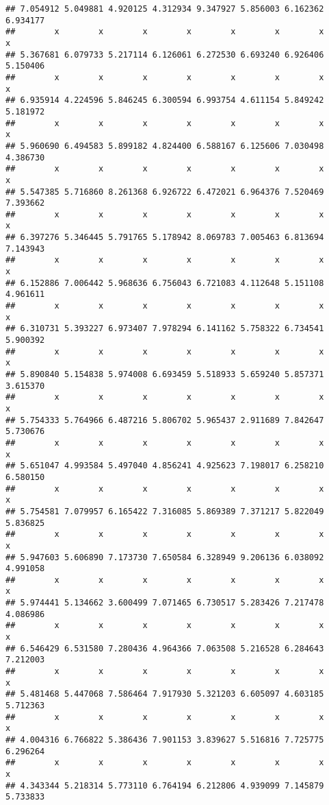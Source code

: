 \documentclass[a4paper,10pt]{book}\usepackage[]{graphicx}\usepackage[]{color}
\makeatletter
\newenvironment{kframe}{%
 \def\at@end@of@kframe{}%
 \ifinner\ifhmode%
  \def\at@end@of@kframe{\end{minipage}}%
  \begin{minipage}{\columnwidth}%
 \fi\fi%
 \def\FrameCommand##1{\hskip\@totalleftmargin \hskip-\fboxsep
 \colorbox{shadecolor}{##1}\hskip-\fboxsep
     \hskip-\linewidth \hskip-\@totalleftmargin \hskip\columnwidth}%
 \MakeFramed {\advance\hsize-\width
   \@totalleftmargin\z@ \linewidth\hsize
   \@setminipage}}%
 {\par\unskip\endMakeFramed%
 \at@end@of@kframe}
\newenvironment{knitrout}{}{} %
\makeatother
\begin{document}
\begin{knitrout}
\begin{kframe}
\begin{verbatim}
## 7.054912 5.049881 4.920125 4.312934 9.347927 5.856003 6.162362 6.934177 
##        x        x        x        x        x        x        x        x 
## 5.367681 6.079733 5.217114 6.126061 6.272530 6.693240 6.926406 5.150406 
##        x        x        x        x        x        x        x        x 
## 6.935914 4.224596 5.846245 6.300594 6.993754 4.611154 5.849242 5.181972 
##        x        x        x        x        x        x        x        x 
## 5.960690 6.494583 5.899182 4.824400 6.588167 6.125606 7.030498 4.386730 
##        x        x        x        x        x        x        x        x 
## 5.547385 5.716860 8.261368 6.926722 6.472021 6.964376 7.520469 7.393662 
##        x        x        x        x        x        x        x        x 
## 6.397276 5.346445 5.791765 5.178942 8.069783 7.005463 6.813694 7.143943 
##        x        x        x        x        x        x        x        x 
## 6.152886 7.006442 5.968636 6.756043 6.721083 4.112648 5.151108 4.961611 
##        x        x        x        x        x        x        x        x 
## 6.310731 5.393227 6.973407 7.978294 6.141162 5.758322 6.734541 5.900392 
##        x        x        x        x        x        x        x        x 
## 5.890840 5.154838 5.974008 6.693459 5.518933 5.659240 5.857371 3.615370 
##        x        x        x        x        x        x        x        x 
## 5.754333 5.764966 6.487216 5.806702 5.965437 2.911689 7.842647 5.730676 
##        x        x        x        x        x        x        x        x 
## 5.651047 4.993584 5.497040 4.856241 4.925623 7.198017 6.258210 6.580150 
##        x        x        x        x        x        x        x        x 
## 5.754581 7.079957 6.165422 7.316085 5.869389 7.371217 5.822049 5.836825 
##        x        x        x        x        x        x        x        x 
## 5.947603 5.606890 7.173730 7.650584 6.328949 9.206136 6.038092 4.991058 
##        x        x        x        x        x        x        x        x 
## 5.974441 5.134662 3.600499 7.071465 6.730517 5.283426 7.217478 4.086986 
##        x        x        x        x        x        x        x        x 
## 6.546429 6.531580 7.280436 4.964366 7.063508 5.216528 6.284643 7.212003 
##        x        x        x        x        x        x        x        x 
## 5.481468 5.447068 7.586464 7.917930 5.321203 6.605097 4.603185 5.712363 
##        x        x        x        x        x        x        x        x 
## 4.004316 6.766822 5.386436 7.901153 3.839627 5.516816 7.725775 6.296264 
##        x        x        x        x        x        x        x        x 
## 4.343344 5.218314 5.773110 6.764194 6.212806 4.939099 7.145879 5.733833 

\end{verbatim}
\end{kframe}
\end{knitrout}
\end{document}
